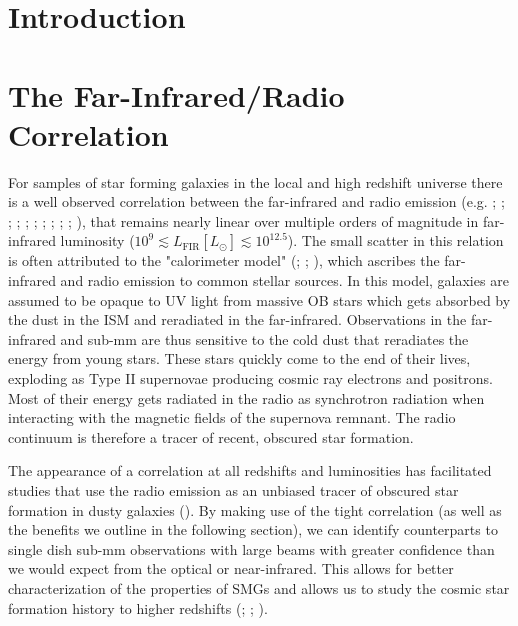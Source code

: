
\section{Introduction}

\section{The Far-Infrared/Radio Correlation}

For samples of star forming galaxies in the local and high redshift universe there is a well observed correlation between the far-infrared and radio emission (e.g. \citealt{Dickey_1984}; \citealt{deJong_1985}; \citealt{Helou_1985}; \citealt{Condon_1992}; \citealt{Barger_2000}; \citealt{Yun_2001}; \citealt{Garrett_2002}; \citealt{Appleton_2004}; \citealt{Ibar_2008}; \citealt{Seymour_2009}; \citealt{Sargent_2010}), that remains nearly linear over multiple orders of magnitude in far-infrared luminosity ($10^{9} \lesssim L_{\textrm{FIR}} [L_{\odot}] \lesssim 10^{12.5}$). The small scatter in this relation is often attributed to the "calorimeter model" (\citealt{Voelk_1989}; \citealt{Lisenfeld_1996}; \citealt{Lacki_2010}), which ascribes the far-infrared and radio emission to common stellar sources. In this model, galaxies are assumed to be opaque to UV light from massive OB stars which gets absorbed by the dust in the ISM and reradiated in the far-infrared. Observations in the far-infrared and sub-mm are thus sensitive to the cold dust that reradiates the energy from young stars. These stars quickly come to the end of their lives, exploding as Type II supernovae producing cosmic ray electrons and positrons. Most of their energy gets radiated in the radio as synchrotron radiation when interacting with the magnetic fields of the supernova remnant. The radio continuum is therefore a tracer of recent, obscured star formation.

The appearance of a correlation at all redshifts and luminosities has facilitated studies that use the radio emission as an unbiased tracer of obscured star formation in dusty galaxies (\citealt{Kennicutt_2012}). By making use of the tight correlation (as well as the benefits we outline in the following section), we can identify counterparts to single dish sub-mm observations with large beams with greater confidence than we would expect from the optical or near-infrared. This allows for better characterization of the properties of SMGs and allows us to study the cosmic star formation history to higher redshifts (\citealt{Madau_2014}; \citealt{Delhaize_2017}; \citealt{Novak_2017}).

